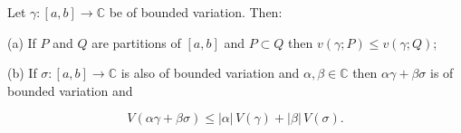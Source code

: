 Let $\gamma: [a, b] \to \mathbb{C}$ be of bounded variation. Then:

(a) If $P$ and $Q$ are partitions of $[a, b]$ and $P \subset Q$ then $v(\gamma; P) \leq v(\gamma; Q)$;

(b) If $\sigma: [a, b] \to \mathbb{C}$ is also of bounded variation and $\alpha, \beta \in \mathbb{C}$ then $\alpha\gamma + \beta\sigma$ is of bounded variation and

$$V(\alpha\gamma + \beta\sigma) \leq |\alpha|\, V(\gamma) + |\beta|\, V(\sigma).$$
